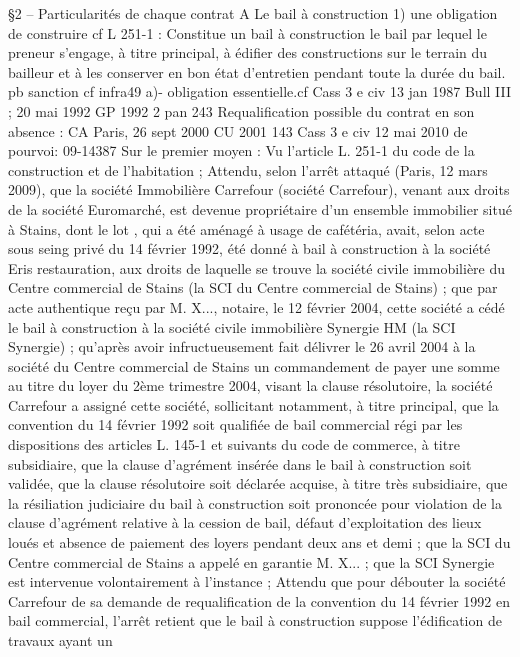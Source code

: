 \documentclass[11pt,a4paper]{report}
\begin{document}
	§2 – Particularités de chaque contrat
	A Le bail à construction
	1) une obligation de construire
	cf L 251-1 : Constitue un bail à construction le bail par lequel le preneur s'engage, à titre principal, à édifier
	des constructions sur le terrain du bailleur et à les conserver en bon état d'entretien pendant toute la durée du
	bail.
	pb sanction cf infra49
	a)- obligation essentielle.cf Cass 3 e civ 13 jan 1987 Bull III  ; 20 mai 1992 GP 1992 2 pan 243
	Requalification possible du contrat en son absence : CA Paris, 26 sept 2000 CU 2001 143
	Cass 3 e civ 12 mai 2010 \No  de pourvoi: 09-14387
	Sur le premier moyen :
	Vu l'article L. 251-1 du code de la construction et de l'habitation ;
	Attendu, selon l'arrêt attaqué (Paris, 12 mars 2009), que la société Immobilière Carrefour (société Carrefour),
	venant aux droits de la société Euromarché, est devenue propriétaire d'un ensemble immobilier situé à Stains,
	dont le lot , qui a été aménagé à usage de cafétéria, avait, selon acte sous seing privé du 14 février 1992, été
	donné à bail à construction à la société Eris restauration, aux droits de laquelle se trouve la société civile
	immobilière du Centre commercial de Stains (la SCI du Centre commercial de Stains) ; que par acte authentique
	reçu par M. X..., notaire, le 12 février 2004, cette société a cédé le bail à construction à la société civile
	immobilière Synergie HM (la SCI Synergie) ; qu'après avoir infructueusement fait délivrer le 26 avril 2004 à la
	société du Centre commercial de Stains un commandement de payer une somme au titre du loyer du 2ème
	trimestre 2004, visant la clause résolutoire, la société Carrefour a assigné cette société, sollicitant notamment, à
	titre principal, que la convention du 14 février 1992 soit qualifiée de bail commercial régi par les dispositions
	des articles L. 145-1 et suivants du code de commerce, à titre subsidiaire, que la clause d'agrément insérée dans
	le bail à construction soit validée, que la clause résolutoire soit déclarée acquise, à titre très subsidiaire, que la
	résiliation judiciaire du bail à construction soit prononcée pour violation de la clause d'agrément relative à la
	cession de bail, défaut d'exploitation des lieux loués et absence de paiement des loyers pendant deux ans et demi
	; que la SCI du Centre commercial de Stains a appelé en garantie M. X... ; que la SCI Synergie est intervenue
	volontairement à l'instance ;
	Attendu que pour débouter la société Carrefour de sa demande de requalification de la convention du 14 février
	1992 en bail commercial, l'arrêt retient que le bail à construction suppose l'édification de travaux ayant un
\end{document}
